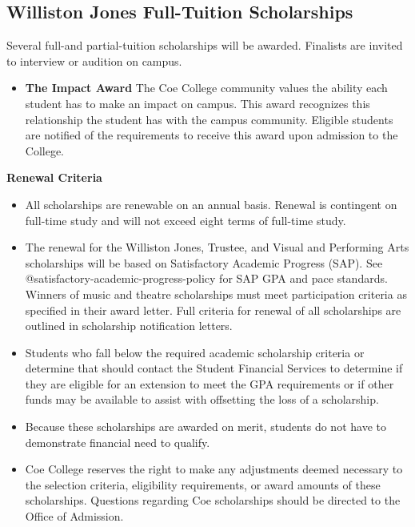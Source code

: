\documentclass[
  letterpaper,
]{scrbook}
\providecommand{\tightlist}{%
  \setlength{\itemsep}{0pt}\setlength{\parskip}{0pt}}
\begin{document}
\subsection{Williston Jones Full-Tuition
Scholarships}\label{williston-jones-full-tuition-scholarships}

Several full-and partial-tuition scholarships will be awarded. Finalists
are invited to interview or audition on campus.

\begin{itemize}
\tightlist
\item
  \textbf{The Impact Award} The Coe College community values the ability
  each student has to make an impact on campus. This award recognizes
  this relationship the student has with the campus community. Eligible
  students are notified of the requirements to receive this award upon
  admission to the College.
\end{itemize}

\textbf{Renewal Criteria}

\begin{itemize}
\tightlist
\item
  All scholarships are renewable on an annual basis. Renewal is
  contingent on full-time study and will not exceed eight terms of
  full-time study.
\item
  The renewal for the Williston Jones, Trustee, and Visual and
  Performing Arts scholarships will be based on Satisfactory Academic
  Progress (SAP). See @satisfactory-academic-progress-policy for SAP GPA
  and pace standards. Winners of music and theatre scholarships must
  meet participation criteria as specified in their award letter. Full
  criteria for renewal of all scholarships are outlined in scholarship
  notification letters.
\item
  Students who fall below the required academic scholarship criteria or
  determine that should contact the Student Financial Services to
  determine if they are eligible for an extension to meet the GPA
  requirements or if other funds may be available to assist with
  offsetting the loss of a scholarship.
\item
  Because these scholarships are awarded on merit, students do not have
  to demonstrate financial need to qualify.
\item
  Coe College reserves the right to make any adjustments deemed
  necessary to the selection criteria, eligibility requirements, or
  award amounts of these scholarships. Questions regarding Coe
  scholarships should be directed to the Office of Admission.
\end{itemize}
\end{document}
